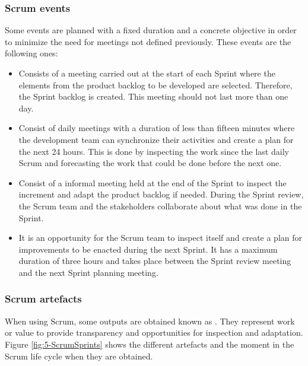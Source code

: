 \subsubsection{Scrum events}
Some events are planned with a fixed duration and a concrete objective in order to minimize the need for meetings not defined previously. These events are the following ones:

\begin{itemize}
	\item {} Consists of a meeting carried out at the start of each Sprint where the elements from the product backlog to be developed are selected. Therefore, the Sprint backlog is created. This meeting should not last more than one day.
	
	\item {} Consist of daily meetings with a duration of less than fifteen minutes where the development team can synchronize their activities and create a plan for the next 24 hours. This is done by inspecting the work since the last daily Scrum and forecasting the work that could be done before the next one.
	
	\item {} Consist of a informal meeting held at the end of the Sprint to inspect the increment and adapt the product backlog if needed. During the Sprint review, the Scrum team and the stakeholders collaborate about what was done in the Sprint.
	
	\item {} It is an opportunity for the Scrum team to inspect itself and create a plan for improvements to be enacted during the next Sprint. It has a maximum duration of three hours and takes place between the Sprint review meeting and the next Sprint planning meeting.
\end{itemize}


\subsubsection{Scrum artefacts}
When using Scrum, some outputs are obtained known as . They represent work or value to provide transparency and opportunities for inspection and adaptation. Figure \ref{fig:5-ScrumSprints} shows the different artefacts and the moment in the Scrum life cycle when they are obtained.

